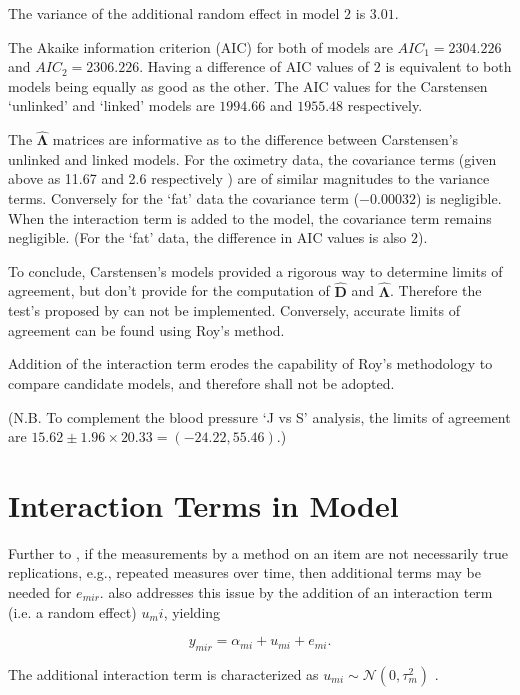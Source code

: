 \documentclass[12pt, a4paper]{report}
\theoremstyle{plain}
\theoremstyle{definition}
\theoremstyle{remark}
\begin{document}
	The variance of the additional random effect in model $2$ is $3.01$.
	
	The Akaike information criterion (AIC) for both of models are $AIC_{1} = 2304.226$ and $AIC_{2} = 2306.226$. Having a difference of AIC values of $2$ is equivalent to both models being equally as good as the other. The AIC values for
	the Carstensen `unlinked' and `linked' models are $1994.66$ and $1955.48$ respectively.
	
	The $\boldsymbol{\hat{\Lambda}}$ matrices are informative as to the difference between Carstensen's unlinked and linked models. For the oximetry data, the covariance terms (given above as 11.67 and 2.6 respectively ) are of similar magnitudes to the variance terms. Conversely for the `fat' data the covariance term ($-0.00032$) is negligible. When the interaction term is added to the model, the covariance term remains negligible. (For the `fat' data, the difference in AIC values is also $2$).
	
	To conclude, Carstensen's models provided a rigorous way to determine limits of agreement, but don't provide for the computation of $\boldsymbol{\hat{D}}$ and $\boldsymbol{\hat{\Lambda}}$. Therefore the test's proposed by \citet{roy} can not be implemented. Conversely, accurate limits of agreement can be found using Roy's method.
	
	Addition of the interaction term erodes the capability of Roy's methodology to compare candidate models, and therefore shall not be adopted.
	
	(N.B. To complement the blood pressure `J vs S' analysis, the limits of agreement are $15.62 \pm 1.96 \times 20.33 = (-24.22, 55.46)$.)
	\newpage
	
	
\section{Interaction Terms in Model}

Further to \citet{barnhart}, if the measurements by a method on an item are not necessarily true replications, e.g., repeated measures over time, then additional terms may be needed for $e_{mir}$. \citet{BSC2008} also addresses this issue by the addition of an interaction term (i.e. a random effect) $u_mi$, yielding

\[ y_{mir} =  \alpha_{mi} + u_{mi} + e_{mi}.  \]

The additional interaction term is characterized as $u_{mi}  \sim \mathcal{N}(0, \tau^2_m)$ \citep{BXC2008}.
\end{document}
